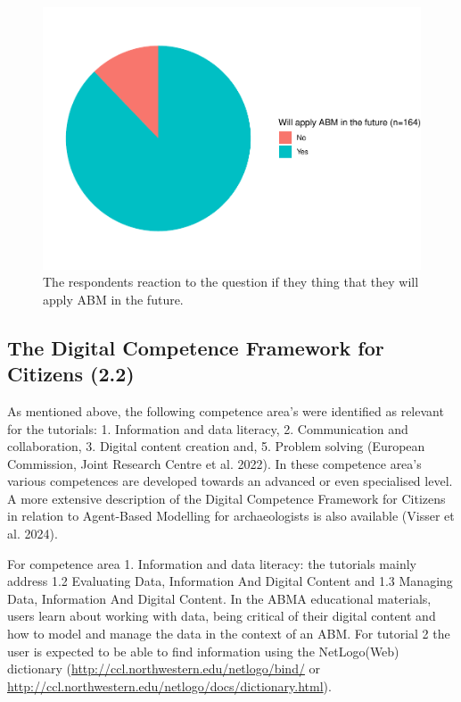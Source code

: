 \documentclass[
]{article}
\begin{document}
\begin{figure}
\includegraphics[height=0.5\textheight]{paper_files/figure-latex/future-abm-1} \caption{The respondents reaction to the question if they thing that they will apply ABM in the future.}\label{fig:future-abm}
\end{figure}

\hypertarget{the-digital-competence-framework-for-citizens-2.2}{%
\subsection{The Digital Competence Framework for Citizens (2.2)}\label{the-digital-competence-framework-for-citizens-2.2}}

As mentioned above, the following competence area's were identified as relevant for the tutorials: 1. Information and data literacy, 2. Communication and collaboration, 3. Digital content creation and, 5. Problem solving (European Commission, Joint Research Centre et al. 2022). In these competence area's various competences are developed towards an advanced or even specialised level. A more extensive description of the Digital Competence Framework for Citizens in relation to Agent-Based Modelling for archaeologists is also available (Visser et al. 2024).

For competence area 1. Information and data literacy: the tutorials mainly address 1.2 Evaluating Data, Information And Digital Content and 1.3 Managing Data, Information And Digital Content. In the ABMA educational materials, users learn about working with data, being critical of their digital content and how to model and manage the data in the context of an ABM. For tutorial 2 the user is expected to be able to find information using the NetLogo(Web) dictionary (\url{http://ccl.northwestern.edu/netlogo/bind/} or \url{http://ccl.northwestern.edu/netlogo/docs/dictionary.html}).
\end{document}

